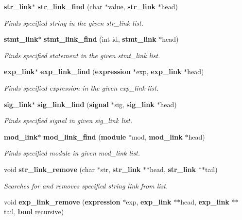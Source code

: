 \begin{CompactItemize}
{\bf str\_\-link}$\ast$ {\bf str\_\-link\_\-find} (char $\ast$value, {\bf str\_\-link} $\ast$head)
\begin{CompactList}\small\item\em Finds specified string in the given str\_\-link list.\item\end{CompactList}\item 
{\bf stmt\_\-link}$\ast$ {\bf stmt\_\-link\_\-find} (int id, {\bf stmt\_\-link} $\ast$head)
\begin{CompactList}\small\item\em Finds specified statement in the given stmt\_\-link list.\item\end{CompactList}\item 
{\bf exp\_\-link}$\ast$ {\bf exp\_\-link\_\-find} ({\bf expression} $\ast$exp, {\bf exp\_\-link} $\ast$head)
\begin{CompactList}\small\item\em Finds specified expression in the given exp\_\-link list.\item\end{CompactList}\item 
{\bf sig\_\-link}$\ast$ {\bf sig\_\-link\_\-find} ({\bf signal} $\ast$sig, {\bf sig\_\-link} $\ast$head)
\begin{CompactList}\small\item\em Finds specified signal in given sig\_\-link list.\item\end{CompactList}\item 
{\bf mod\_\-link}$\ast$ {\bf mod\_\-link\_\-find} ({\bf module} $\ast$mod, {\bf mod\_\-link} $\ast$head)
\begin{CompactList}\small\item\em Finds specified module in given mod\_\-link list.\item\end{CompactList}\item 
void {\bf str\_\-link\_\-remove} (char $\ast$str, {\bf str\_\-link} $\ast$$\ast$head, {\bf str\_\-link} $\ast$$\ast$tail)
\begin{CompactList}\small\item\em Searches for and removes specified string link from list.\item\end{CompactList}\item 
void {\bf exp\_\-link\_\-remove} ({\bf expression} $\ast$exp, {\bf exp\_\-link} $\ast$$\ast$head, {\bf exp\_\-link} $\ast$$\ast$tail, {\bf bool} recursive)

\end{CompactItemize}
